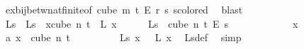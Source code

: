 \begin{isabellebody}
\ ex{\isacharunderscore}{\kern0pt}bij{\isacharunderscore}{\kern0pt}betw{\isacharunderscore}{\kern0pt}nat{\isacharunderscore}{\kern0pt}finite{\isacharunderscore}{\kern0pt}{}{\isacharbrackleft}{\kern0pt}of\ {\isachardoublequoteopen}cube\ m\ {\isacharparenleft}{\kern0pt}t{\isacharplus}{\kern0pt}{}{\isacharparenright}{\kern0pt}\ {\isasymrightarrow}\isactrlsub E\ {\isacharbraceleft}{\kern0pt}{\isachardot}{\kern0pt}{\isachardot}{\kern0pt}{\isacharless}{\kern0pt}r{\isacharbraceright}{\kern0pt}{\isachardoublequoteclose}\ {\isachardoublequoteopen}s{\isachardoublequoteclose}{\isacharbrackright}{\kern0pt}\ s{\isacharunderscore}{\kern0pt}colored\ \isamarkupfalse%
\ blast\isanewline
\ \ \ \ \isamarkupfalse%
\ {\isasymchi}L{\isacharunderscore}{\kern0pt}s\ \ {\isachardoublequoteopen}{\isasymchi}L{\isacharunderscore}{\kern0pt}s\ {\isasymequiv}\ {\isacharparenleft}{\kern0pt}{\isasymlambda}x{\isasymin}cube\ n\ {\isacharparenleft}{\kern0pt}t{\isacharplus}{\kern0pt}{}{\isacharparenright}{\kern0pt}{\isachardot}{\kern0pt}\ {\isasymphi}\ {\isacharparenleft}{\kern0pt}{\isasymchi}L\ x{\isacharparenright}{\kern0pt}{\isacharparenright}{\kern0pt}{\isachardoublequoteclose}\isanewline
\ \ \ \ \isamarkupfalse%
\ {\isachardoublequoteopen}{\isasymchi}L{\isacharunderscore}{\kern0pt}s\ {\isasymin}\ cube\ n\ {\isacharparenleft}{\kern0pt}t{\isacharplus}{\kern0pt}{}{\isacharparenright}{\kern0pt}\ {\isasymrightarrow}\isactrlsub E\ {\isacharbraceleft}{\kern0pt}{\isachardot}{\kern0pt}{\isachardot}{\kern0pt}{\isacharless}{\kern0pt}s{\isacharbraceright}{\kern0pt}{\isachardoublequoteclose}\isanewline
\ \ \ \ \isamarkupfalse%
\isanewline
\ \ \ \ \ \ \isamarkupfalse%
\ x\ \isamarkupfalse%
\ a{\isacharcolon}{\kern0pt}\ {\isachardoublequoteopen}x\ {\isasymin}\ cube\ n\ {\isacharparenleft}{\kern0pt}t{\isacharplus}{\kern0pt}{}{\isacharparenright}{\kern0pt}{\isachardoublequoteclose}\isanewline
\ \ \ \ \ \ \isamarkupfalse%
\ \isamarkupfalse%
\ {\isachardoublequoteopen}{\isasymchi}L{\isacharunderscore}{\kern0pt}s\ x\ {\isacharequal}{\kern0pt}\ {\isasymphi}\ {\isacharparenleft}{\kern0pt}{\isasymchi}L\ x{\isacharparenright}{\kern0pt}{\isachardoublequoteclose}\ \isamarkupfalse%
\ {\isasymchi}L{\isacharunderscore}{\kern0pt}s{\isacharunderscore}{\kern0pt}def\ \isamarkupfalse%
\ simp\isanewline
\ \ \ \ \ \ \isamarkupfalse%
\ \isamarkupfalse%

\end{isabellebody}
